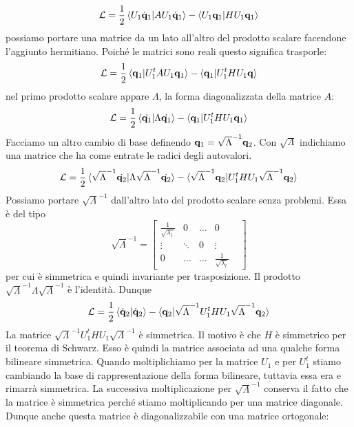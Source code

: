     \begin{equation}
        \mathcal{L} = \frac{1}{2}\braket{ U_1\dot{\mathbf{q}}_1|AU_1\dot{\mathbf{q}}_1}- \braket{U_1\mathbf{q}_1|HU_1\mathbf{q}_1}
    \end{equation}
    possiamo portare una matrice da un lato all'altro del prodotto scalare facendone l'aggiunto hermitiano. Poiché le matrici sono reali questo significa trasporle:
    \begin{equation}
        \mathcal{L} = \frac{1}{2}\braket{\mathbf{q}_1|U_1^tAU_1\mathbf{q}_1} - \braket{\mathbf{q}_1|U_1^tHU_1\mathbf{q}}
    \end{equation}
    nel primo prodotto scalare appare $\Lambda$, la forma diagonalizzata della matrice $A$:
    \begin{equation}
        \mathcal{L} = \frac{1}{2}\braket{\dot{\mathbf{q}_1}|\Lambda\dot{\mathbf{q}_1}} - \braket{\mathbf{q}_1|U_1^tHU_1\mathbf{q}_1}
    \end{equation}
    Facciamo un altro cambio di base definendo $\mathbf{q}_1=\sqrt{\Lambda}^{-1}\mathbf{q}_2$. Con $\sqrt{\Lambda}$ indichiamo una matrice che ha come entrate le radici degli autovalori.
    \begin{equation}
        \mathcal{L} =\frac{1}{2}\braket{\sqrt{\Lambda}^{-1}\dot{\mathbf{q}_2} |\Lambda \sqrt{\Lambda}^{-1}\dot{\mathbf{q}_2}}- \braket{\sqrt{\Lambda}^{-1}\mathbf{q}_2|U_1^tHU_1\sqrt{\Lambda}^{-1}\mathbf{q}_2}
    \end{equation}
    Possiamo portare $\sqrt{\Lambda}^{-1}$ dall'altro lato del prodotto scalare senza problemi. Essa è del tipo
    \begin{equation}
        \sqrt{\Lambda}^{-1} = \begin{bmatrix}
            \frac{1}{\sqrt{\lambda_1}}&0&\dots&0\\
            \vdots & \ddots &0&\vdots& \\
            0 &\dots &\dots  & \frac{1}{\sqrt{\lambda_l}}
        \end{bmatrix}
    \end{equation}
    per cui è simmetrica e quindi invariante per trasposizione. Il prodotto $\sqrt{\Lambda}^{-1}\Lambda\sqrt{\Lambda}^{-1}$ è l'identità. Dunque
    \begin{equation}
        \mathcal{L} = \frac{1}{2}\braket{\dot{\mathbf{q}}_2|\dot{\mathbf{q}}_2}-\braket{\mathbf{q}_2|\sqrt{\Lambda}^{-1}U_1^tHU_1\sqrt{\Lambda}^{-1}\mathbf{q}_2}
    \end{equation}
    La matrice $\sqrt{\Lambda}^{-1}U_1^tHU_1\sqrt{\Lambda}^{-1}$ è simmetrica. Il motivo è che $H$ è simmetrico per il teorema di Schwarz. Esso è quindi la matrice associata ad una qualche forma bilineare simmetrica. Quando moltiplichiamo per la matrice $U_1$ e per $U_1^t$ stiamo cambiando la base di rappresentazione della forma bilineare, tuttavia essa era e rimarrà simmetrica. La successiva moltiplicazione per $\sqrt{\Lambda}^{-1}$ conserva il fatto che la matrice è simmetrica perché stiamo moltiplicando per una matrice diagonale. Dunque anche questa matrice è diagonalizzabile con una matrice ortogonale:

